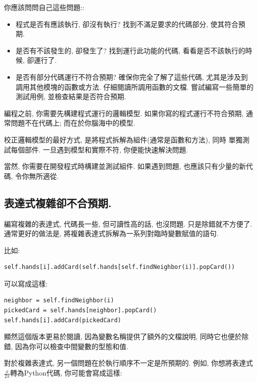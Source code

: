 \documentclass[10pt]{book}
\begin{document}
你應該問問自己這些問題::

\begin{itemize}

\item 程式是否有應該執行, 卻沒有執行?
找到不滿足要求的代碼部分, 使其符合預期. 

\item 是否有不該發生的, 卻發生了?
找到運行此功能的代碼, 看看是否不該執行的時候, 卻運行了. 

\item 是否有部分代碼運行不符合預期? 
確保你完全了解了這些代碼, 尤其是涉及到調用其他模塊的函數或方法. 
仔細閱讀所調用函數的文檔. 
嘗試編寫一些簡單的測試用例, 並檢查結果是否符合預期. 
\end{itemize}

編程之前, 你需要先構建程式運行的邏輯模型. 
如果你寫的程式運行不符合預期, 
通常問題不在代碼上; 而在於你腦海中的模型. 

校正邏輯模型的最好方式, 是將程式拆解為組件(通常是函數和方法), 同時
單獨測試每個部件. 
一旦遇到模型和實際不符, 你便能快速解決問題. 

當然, 你需要在開發程式時構建並測試組件. 
如果遇到問題, 也應該只有少量的新代碼, 令你無所適從. 


\subsection{表達式複雜卻不合預期.}

編寫複雜的表達式, 代碼長一些, 但可讀性高的話, 也沒問題.
只是除錯就不方便了. 
通常更好的做法是, 將複雜表達式拆解為一系列對臨時變數賦值的語句. 

比如:

\begin{verbatim}
self.hands[i].addCard(self.hands[self.findNeighbor(i)].popCard())
\end{verbatim}
%
可以寫成這樣:

\begin{verbatim}
neighbor = self.findNeighbor(i)
pickedCard = self.hands[neighbor].popCard()
self.hands[i].addCard(pickedCard)
\end{verbatim}
%

顯然這個版本更易於閱讀, 因為變數名稱提供了額外的文檔說明, 
同時它也便於除錯, 因為你可以檢查中間變數的型態和值. 

對於複雜表達式, 另一個問題在於執行順序不一定是所預期的. 
例如, 你想將表達式$\frac{x}{2 \pi}$轉為Python代碼, 
你可能會寫成這樣:
\end{document}
